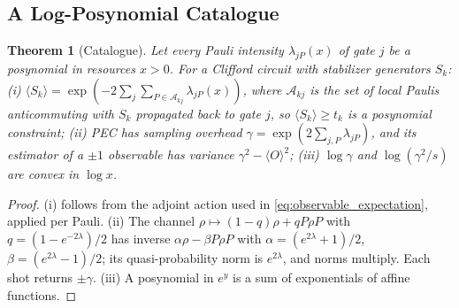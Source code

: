 \documentclass[10pt,letterpaper,journal]{IEEEtran}
\newtheorem{theorem}{Theorem}
\begin{document}
\subsection{A Log-Posynomial Catalogue}
\begin{theorem}[Catalogue]\label{th:catalogue}
Let every Pauli intensity $\lambda_{jP}(x)$ of gate $j$ be a posynomial in resources $x>0$. For a Clifford circuit with stabilizer generators $S_k$: (i) $\langle S_k\rangle=\exp(-2\sum_j\sum_{P\in\mathcal A_{kj}}\lambda_{jP}(x))$, where $\mathcal A_{kj}$ is the set of local Paulis anticommuting with $S_k$ propagated back to gate $j$, so $\langle S_k\rangle\ge t_k$ is a posynomial constraint; (ii) PEC has sampling overhead $\gamma=\exp(2\sum_{j,P}\lambda_{jP})$, and its estimator of a $\pm1$ observable has variance $\gamma^2-\langle O\rangle^2$; (iii) $\log\gamma$ and $\log(\gamma^2/s)$ are convex in $\log x$.
\end{theorem}
\begin{proof}
(i) follows from the adjoint action used in \eqref{eq:observable_expectation}, applied per Pauli. (ii) The channel $\rho\mapsto(1-q)\rho+qP\rho P$ with $q=(1-e^{-2\lambda})/2$ has inverse $\alpha\rho-\beta P\rho P$ with $\alpha=(e^{2\lambda}+1)/2$, $\beta=(e^{2\lambda}-1)/2$; its quasi-probability norm is $e^{2\lambda}$, and norms multiply. Each shot returns $\pm\gamma$. (iii) A posynomial in $e^y$ is a sum of exponentials of affine functions.
\end{proof}
\end{document}
